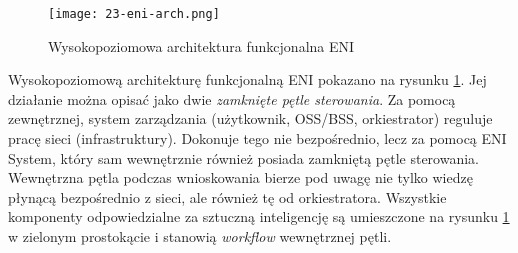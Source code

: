 \begin{figure}[!htbp]
    \centering \texttt{[image: 23-eni-arch.png]}
    \caption{Wysokopoziomowa architektura funkcjonalna ENI}\label{fig:23-eni-arch}
\end{figure}

Wysokopoziomową architekturę funkcjonalną ENI pokazano na rysunku \ref{fig:23-eni-arch}. Jej działanie można opisać jako dwie \textit{zamknięte pętle sterowania}. Za pomocą zewnętrznej, system zarządzania (użytkownik, OSS/BSS, orkiestrator) reguluje pracę sieci (infrastruktury). Dokonuje tego nie bezpośrednio, lecz za pomocą ENI System, który sam wewnętrznie również posiada zamkniętą pętle sterowania. Wewnętrzna pętla podczas wnioskowania bierze pod uwagę nie tylko wiedzę płynącą bezpośrednio z sieci, ale również tę od orkiestratora. Wszystkie komponenty odpowiedzialne za sztuczną inteligencję są umieszczone na rysunku \ref{fig:23-eni-arch} w zielonym prostokącie i stanowią \textit{workflow} wewnętrznej pętli. 